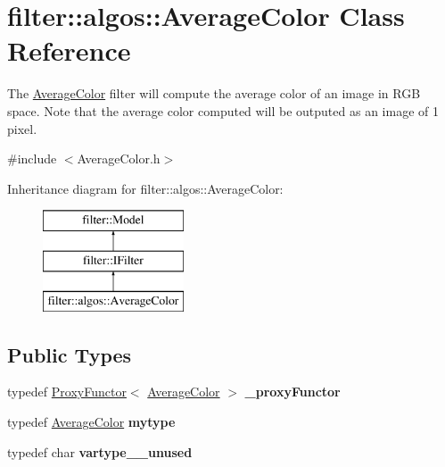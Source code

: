 \hypertarget{classfilter_1_1algos_1_1_average_color}{}\section{filter\+:\+:algos\+:\+:Average\+Color Class Reference}
\label{classfilter_1_1algos_1_1_average_color}


The \hyperlink{classfilter_1_1algos_1_1_average_color}{Average\+Color} filter will compute the average color of an image in R\+GB space. Note that the average color computed will be outputed as an image of 1 pixel.  




{\ttfamily \#include $<$Average\+Color.\+h$>$}

Inheritance diagram for filter\+:\+:algos\+:\+:Average\+Color\+:\begin{figure}[H]
\begin{center}
\leavevmode
\includegraphics[height=3.000000cm]{d0/d2d/classfilter_1_1algos_1_1_average_color}
\end{center}
\end{figure}
\subsection*{Public Types}
\begin{DoxyCompactItemize}
\item 
\mbox{\label{classfilter_1_1algos_1_1_average_color_a6d6bddfbd1497d766e0c16418c2ef5ae}} 
typedef \hyperlink{class_proxy_functor}{Proxy\+Functor}$<$ \hyperlink{classfilter_1_1algos_1_1_average_color}{Average\+Color} $>$ {\bfseries \+\_\+proxy\+Functor}
\item 
\mbox{\label{classfilter_1_1algos_1_1_average_color_a8e1c2dc4fd41f7747d7097faf266cf68}} 
typedef \hyperlink{classfilter_1_1algos_1_1_average_color}{Average\+Color} {\bfseries mytype}
\item 
\mbox{\label{classfilter_1_1algos_1_1_average_color_aea30f21a4e423a96300e69ec91d28caa}} 
typedef char {\bfseries vartype\+\_\+\+\_\+unused}
\end{DoxyCompactItemize}
